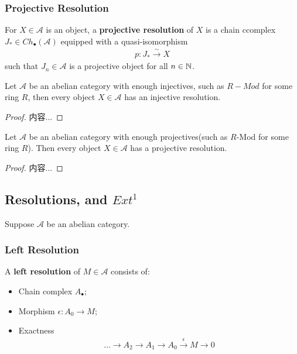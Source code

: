 \documentclass[Total.tex]{subfiles}
\begin{document}
					\subsubsection{Projective Resolution}
					\begin{Def}
					For $X\in \mathcal{A}$ is an object, a \textbf{projective resolution} of $X$ is a chain ccomplex $J_*\in Ch_\bullet(\mathcal{A})$ equipped with a quasi-isomorphism
					\begin{gather*}
						p:J_*\stackrel{\sim}{\rightarrow} X
					\end{gather*}
					such that $J_n\in \mathcal{A}$ is a projective object for all $n\in \mathbb{N}$.
					\end{Def}
					\begin{center}
					\end{center}
					
					\begin{proposition}
					Let $\mathcal{A}$ be an abelian category with enough injectives, such as $R-Mod$ for some ring $R$, then every object $X\in \mathcal{A}$ has an injective resolution.
					\end{proposition}
					\begin{proof}
					内容...
					\end{proof}
					\begin{proposition}
					Let $\mathcal{A}$ be an abelian category with enough projectives(such as $R$-Mod for some ring $R$). Then every object $X\in \mathcal{A}$ has a projective resolution.
					\end{proposition}
					\begin{proof}
					内容...
					\end{proof}
					\subsection{Resolutions, and $Ext^1$}
					Suppose $\mathcal{A}$ be an abelian category.
					\subsubsection{Left Resolution}
					
					\begin{Def}
					A \textbf{left resolution} of $M\in \mathcal{A}$ consists of:
					\begin{itemize}
						\item Chain complex $A_\bullet$;
						\item Morphism $\epsilon:A_0\rightarrow M$;
						\item Exactness
						\begin{gather*}
							\dots\rightarrow A_2\rightarrow A_1\rightarrow A_0\stackrel{\epsilon}{\rightarrow} M\rightarrow 0
						\end{gather*}
					\end{itemize}
					\end{Def}
\end{document}
